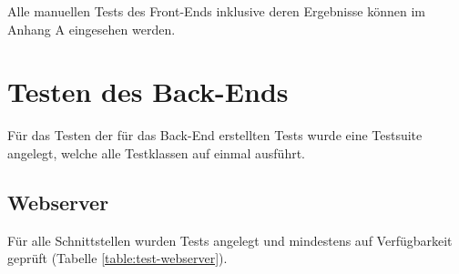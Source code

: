 Alle manuellen Tests des Front-Ends inklusive deren Ergebnisse können im Anhang A eingesehen werden.

\section{Testen des Back-Ends}
Für das Testen der für das Back-End erstellten Tests wurde eine Testsuite angelegt, welche alle Testklassen auf einmal ausführt.
\subsection{Webserver}
Für alle Schnittstellen wurden Tests angelegt und mindestens auf Verfügbarkeit geprüft (Tabelle \ref{table:test-webserver}).

\begin{table}[h]
	\centering
	\caption{Unittests für Webserver}
	\label{table:test-webserver}
\end{table}

